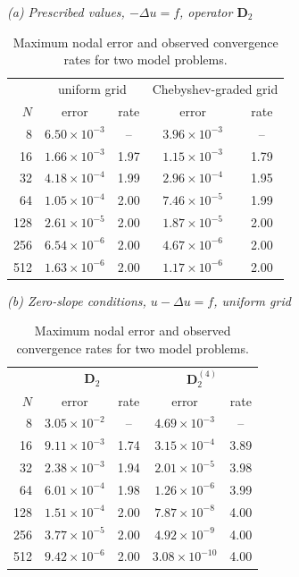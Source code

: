 \documentclass[11pt]{article}
\begin{document}
\begin{table}[htbp]\centering\small
\caption{Maximum nodal error and observed convergence rates for two model problems.}
\textit{(a) Prescribed values, $-\Delta u=f$, operator $\mathbf D_2$}\\[2pt]
\begin{tabular}{r cc cc}
\toprule
& \multicolumn{2}{c}{uniform grid} & \multicolumn{2}{c}{Chebyshev-graded grid}\\
$N$ & error & rate & error & rate\\
\midrule
8 & $6.50{\times}10^{-3}$ & -- & $3.96{\times}10^{-3}$ & --\\
16 & $1.66{\times}10^{-3}$ & 1.97 & $1.15{\times}10^{-3}$ & 1.79\\
32 & $4.18{\times}10^{-4}$ & 1.99 & $2.96{\times}10^{-4}$ & 1.95\\
64 & $1.05{\times}10^{-4}$ & 2.00 & $7.46{\times}10^{-5}$ & 1.99\\
128 & $2.61{\times}10^{-5}$ & 2.00 & $1.87{\times}10^{-5}$ & 2.00\\
256 & $6.54{\times}10^{-6}$ & 2.00 & $4.67{\times}10^{-6}$ & 2.00\\
512 & $1.63{\times}10^{-6}$ & 2.00 & $1.17{\times}10^{-6}$ & 2.00\\
\bottomrule
\end{tabular}

\medskip
\textit{(b) Zero-slope conditions, $u-\Delta u=f$, uniform grid}\\[2pt]
\begin{tabular}{r cc cc}
\toprule
& \multicolumn{2}{c}{$\mathbf D_2$} & \multicolumn{2}{c}{$\mathbf D_2^{(4)}$}\\
$N$ & error & rate & error & rate\\
\midrule
8 & $3.05{\times}10^{-2}$ & -- & $4.69{\times}10^{-3}$ & --\\
16 & $9.11{\times}10^{-3}$ & 1.74 & $3.15{\times}10^{-4}$ & 3.89\\
32 & $2.38{\times}10^{-3}$ & 1.94 & $2.01{\times}10^{-5}$ & 3.98\\
64 & $6.01{\times}10^{-4}$ & 1.98 & $1.26{\times}10^{-6}$ & 3.99\\
128 & $1.51{\times}10^{-4}$ & 2.00 & $7.87{\times}10^{-8}$ & 4.00\\
256 & $3.77{\times}10^{-5}$ & 2.00 & $4.92{\times}10^{-9}$ & 4.00\\
512 & $9.42{\times}10^{-6}$ & 2.00 & $3.08{\times}10^{-10}$ & 4.00\\
\bottomrule
\end{tabular}
\end{table}
\end{document}
